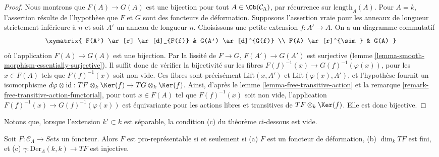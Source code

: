 \begin{proof}
Nous montrons que $F(A) \to G(A)$ est une bijection pour tout $A \in
\Ob(\mathcal{C}_\Lambda)$, par récurrence sur
$\text{length}_A(A)$. Pour $A = k$, l'assertion résulte de
l'hypothèse que $F$ et $G$ sont des foncteurs de déformation. Supposons
l'assertion vraie pour les anneaux de longueur strictement inférieure à $n$ et
soit $A'$ un anneau de longueur $n$. Choisissons une petite extension
$f : A' \to A$. On a un diagramme commutatif
$$
\xymatrix{
F(A') \ar[r] \ar[d]_{F(f)} & G(A') \ar[d]^{G(f)} \\
F(A) \ar[r]^{\sim} & G(A)
}
$$
où l'application $F(A) \to G(A)$ est une bijection. Par la lissité de $F
\to G$, $F(A') \to G(A')$ est surjective (lemme
\ref{lemma-smooth-morphism-essentially-surjective}). Il suffit donc de vérifier
la bijectivité sur les fibres $F(f)^{-1}(x) \to
G(f)^{-1}(\varphi(x))$, pour les $x \in F(A)$ tels que $F(f)^{-1}(x)$ soit
non vide. Ces fibres sont précisément $\text{Lift}(x, A')$ et
$\text{Lift}(\varphi(x), A')$, et l'hypothèse fournit un isomorphisme
$d\varphi \otimes \text{id} :
TF \otimes_k \Ker(f)  \to TG \otimes_k \Ker(f)$.
Ainsi, d'après le lemme \ref{lemma-free-transitive-action} et la remarque
\ref{remark-free-transitive-action-functorial}, pour tout $x \in F(A)$ tel que
$F(f)^{-1}(x)$ soit non vide, l'application
$F(f)^{-1}(x) \to G(f)^{-1}(\varphi(x))$ est équivariante pour les actions
libres et transitives de
$TF \otimes_k \Ker(f)$. Elle est donc bijective.
\end{proof}

\noindent
Notons que, lorsque l'extension $k' \subset k$ est séparable, la condition (c)
du théorème ci-dessous est vide.

\begin{theorem}
\label{theorem-Schlessinger-prorepresentability}
Soit $F: \mathcal{C}_\Lambda \to \textit{Sets}$ un foncteur. Alors $F$ est
pro-représentable si et seulement si (a) $F$ est un foncteur de déformation,
(b) $\dim_k TF$ est fini, et (c) $\gamma : \text{Der}_\Lambda(k, k) \to TF$
est injective.
\end{theorem}

